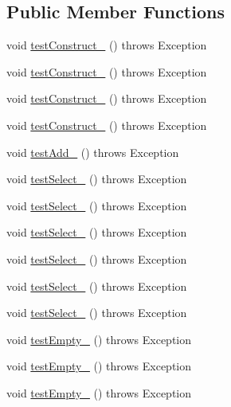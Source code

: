\subsection*{Public Member Functions}
\begin{DoxyCompactItemize}
\item 
void \hyperlink{classorg_1_1jgap_1_1impl_1_1_threshold_selector_test_a8e722bcfc0bc86ed78557efcb432c9bb}{test\-Construct\-\_} ()  throws Exception 
\item 
void \hyperlink{classorg_1_1jgap_1_1impl_1_1_threshold_selector_test_ae2684433e606437e4d5ab742f1c81f8a}{test\-Construct\-\_} ()  throws Exception 
\item 
void \hyperlink{classorg_1_1jgap_1_1impl_1_1_threshold_selector_test_a3937c1e6775e5e1f952393943b7037f2}{test\-Construct\-\_} ()  throws Exception 
\item 
void \hyperlink{classorg_1_1jgap_1_1impl_1_1_threshold_selector_test_ac91accbdab615d89f5510e044b37d2be}{test\-Construct\-\_} ()  throws Exception 
\item 
void \hyperlink{classorg_1_1jgap_1_1impl_1_1_threshold_selector_test_a1aab7bfc5512f010dc195eee2cb9f365}{test\-Add\-\_} ()  throws Exception 
\item 
void \hyperlink{classorg_1_1jgap_1_1impl_1_1_threshold_selector_test_accc122062656d25f6cf8b3af91c2cc93}{test\-Select\-\_} ()  throws Exception 
\item 
void \hyperlink{classorg_1_1jgap_1_1impl_1_1_threshold_selector_test_aa0bc75f6622d1cceba6fbed7f7a145c1}{test\-Select\-\_} ()  throws Exception 
\item 
void \hyperlink{classorg_1_1jgap_1_1impl_1_1_threshold_selector_test_ae0b3ae117fbb65842af13b3ee3e2669b}{test\-Select\-\_} ()  throws Exception 
\item 
void \hyperlink{classorg_1_1jgap_1_1impl_1_1_threshold_selector_test_a71af58e2ac27301941c73913dfe933c4}{test\-Select\-\_} ()  throws Exception 
\item 
void \hyperlink{classorg_1_1jgap_1_1impl_1_1_threshold_selector_test_aa55736351dd7032024d7e4193a5e5be6}{test\-Select\-\_} ()  throws Exception 
\item 
void \hyperlink{classorg_1_1jgap_1_1impl_1_1_threshold_selector_test_a54eb7bbfa1808d7b34585298b545daeb}{test\-Select\-\_} ()  throws Exception 
\item 
void \hyperlink{classorg_1_1jgap_1_1impl_1_1_threshold_selector_test_a2f12aa3895db16cfbae9dc61526df99e}{test\-Empty\-\_} ()  throws Exception 
\item 
void \hyperlink{classorg_1_1jgap_1_1impl_1_1_threshold_selector_test_aaca04fc38c6de4069ffc199dce3797b8}{test\-Empty\-\_} ()  throws Exception 
\item 
void \hyperlink{classorg_1_1jgap_1_1impl_1_1_threshold_selector_test_ad5d2c138981458108aa3d60d46c55e09}{test\-Empty\-\_} ()  throws Exception 
\end{DoxyCompactItemize}
